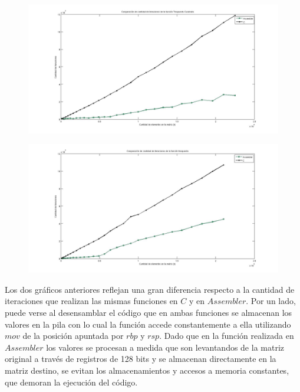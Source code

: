 \documentclass[10pt, a4paper]{article}
\begin{document}
\begin{figure}[H] %
\begin{center}
\includegraphics[width=500pt]{../imgs/comparacion_traspuestaCuadrada.jpg}
\end{center}
\end{figure}

\begin{figure}[H] %
\begin{center}
\includegraphics[width=500pt]{../imgs/comparacion_traspuesta.jpg}
\end{center}
\end{figure}

Los dos gráficos anteriores reflejan una gran diferencia respecto a la cantidad de iteraciones que realizan las mismas funciones en $C$ y en $Assembler$. Por un lado, puede verse al desensamblar el código que en ambas funciones se almacenan los valores en la pila con lo cual la función accede constantemente a ella utilizando $mov$ de la posición apuntada por $rbp$ y $rsp$. Dado que en la función realizada en $Assembler$ los valores se procesan a medida que son levantandos de la matriz original a través de registros de 128 bits y se almacenan directamente en la matriz destino, se evitan los almacenamientos y accesos a memoria constantes, que demoran la ejecución del código.  
\end{document}
